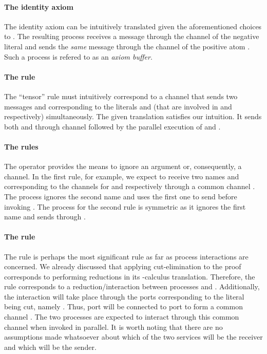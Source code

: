 \documentclass[copyright,creativecommons]{eptcs}
\begin{document}
\paragraph{The identity axiom} The identity axiom  can be intuitively translated given the aforementioned choices to . The resulting process receives a message  through the channel  of the negative literal and sends the \textit{same} message  through the channel of the positive atom . Such a process is refered to as an \textit{axiom buffer}.

\paragraph{The  rule} The ``tensor'' rule must intuitively correspond to a channel  that sends two messages  and  corresponding to the literals  and  (that are involved in  and  respectively) simultaneously. The given translation satisfies our intuition. It sends both  and  through channel  followed by the parallel execution of  and .


\paragraph{The  rules} The  operator provides the means to ignore an argument or, consequently, a channel. In the first rule, for example, we expect to receive two names  and  corresponding to the channels for  and  respectively through a common channel . The process ignores the second name  and uses the first one  to send  before invoking . The process for the second rule is symmetric as it ignores the first name  and sends  through . 

\paragraph{The  rule} The  rule is perhaps the most significant rule as far as process interactions are concerned. We already discussed that applying cut-elimination to the proof corresponds to performing reductions in its -calculus translation. Therefore, the  rule corresponds to a reduction/interaction between processes  and . Additionally, the interaction will take place through the ports corresponding to the literal being cut, namely . Thus, port  will be connected to port  to form a common channel . The two processes are expected to interact through this common channel  when invoked in parallel. It is worth noting that there are no assumptions made whatsoever about which of the two services will be the receiver and which will be the sender.
\end{document}
